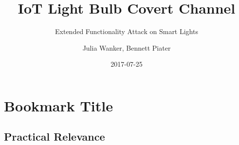 \documentclass[11pt,t,usepdftitle=false,aspectratio=169]{beamer}
\title[IoT Light Bulb Attack]{IoT Light Bulb Covert Channel}
\subtitle{Extended Functionality Attack on Smart Lights}
\author[Julia Wanker \& Bennett Piater]{Julia Wanker, Bennett Piater}
\date{2017-07-25}
\begin{document}



\section{Bookmark Title}

\subsection{Practical Relevance}
\end{document}
